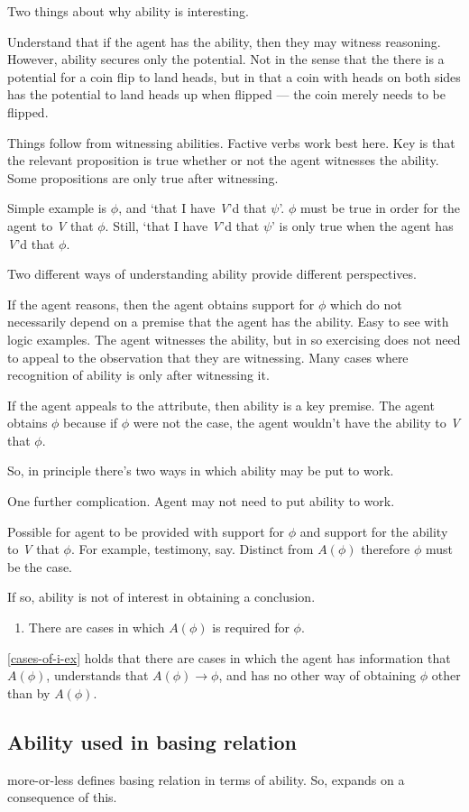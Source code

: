 Two things about why ability is interesting.

Understand that if the agent has the ability, then they may witness reasoning.
However, ability secures only the potential.
Not in the sense that the there is a potential for a coin flip to land heads, but in that a coin with heads on both sides has the potential to land heads up when flipped --- the coin merely needs to be flipped.

Things follow from witnessing abilities.
Factive verbs work best here.
Key is that the relevant proposition is true whether or not the agent witnesses the ability.
Some propositions are only true after witnessing.

Simple example is \(\phi\), and `that I have \emph{V}'d that \(\psi\)'.
\(\phi\) must be true in order for the agent to \emph{V} that \(\phi\).
Still, `that I have \emph{V}'d that \(\psi\)' is only true when the agent has \emph{V}'d that \(\phi\).

Two different ways of understanding ability provide different perspectives.

If the agent reasons, then the agent obtains support for \(\phi\) which do not necessarily depend on a premise that the agent has the ability.
Easy to see with logic examples.
The agent witnesses the ability, but in so exercising does not need to appeal to the observation that they are witnessing.
Many cases where recognition of ability is only after witnessing it.

If the agent appeals to the attribute, then ability is a key premise.
The agent obtains \(\phi\) because if \(\phi\) were not the case, the agent wouldn't have the ability to \emph{V} that \(\phi\).

So, in principle there's two ways in which ability may be put to work.

One further complication.
Agent may not need to put ability to work.

Possible for agent to be provided with support for \(\phi\) and support for the ability to \emph{V} that \(\phi\).
For example, testimony, say.
Distinct from \(A(\phi)\) therefore \(\phi\) must be the case.

If so, ability is not of interest in obtaining a conclusion.

\begin{enumerate}
\item\label{cases-of-i-ex} There are cases in which \(A(\phi)\) is required for \(\phi\).
\end{enumerate}

\ref{cases-of-i-ex} holds that there are cases in which the agent has information that \(A(\phi)\), understands that \(A(\phi) \rightarrow \phi\), and has no other way of obtaining \(\phi\) other than by \(A(\phi)\).

\subsection{Ability used in basing relation}
\label{sec:ability-used-basing}

\cite{Leite:2004uv} more-or-less defines basing relation in terms of ability.
So, expands on a consequence of this.